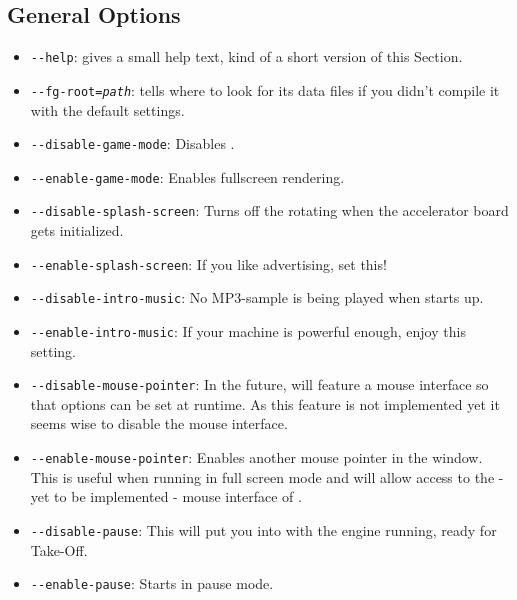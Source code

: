 \subsection{General Options}

\begin{itemize}

\item{\texttt{-$\!$-help}}: gives a small help text, kind of a short version of this Section.

\item{\texttt{-$\!$-fg-root={\it path}}}: tells \FlightGear where to look for its data
  files if you didn't compile it with the default settings.

\item{\texttt{-$\!$-disable-game-mode}}: Disables .


\item{\texttt{-$\!$-enable-game-mode}}: Enables fullscreen rendering.


\item{\texttt{-$\!$-disable-splash-screen}}: Turns off the rotating  when the accelerator board gets initialized.

\item{\texttt{-$\!$-enable-splash-screen}}: If you like advertising, set this!

\item{\texttt{-$\!$-disable-intro-music}}: No MP3-sample is being played when
  \FlightGear starts up.

\item{\texttt{-$\!$-enable-intro-music}}: If your machine is powerful enough, enjoy
  this setting.

\item{\texttt{-$\!$-disable-mouse-pointer}}: In the future, \FlightGear will
  feature a mouse interface so that options can be set at runtime.  As
  this feature is not implemented yet it seems wise to disable the
  mouse interface.

\item{\texttt{-$\!$-enable-mouse-pointer}}: Enables another mouse pointer in the
  \FlightGear window. This is useful when running \FlightGear in full
  screen mode and will allow access to the - yet to be implemented -
  mouse interface of \FlightGear\hspace{-2mm}.

\item{\texttt{-$\!$-disable-pause}}: This will put you into \FlightGear with the
  engine running, ready for Take-Off.

\item{\texttt{-$\!$-enable-pause}}: Starts \FlightGear in pause mode.

\end{itemize}

